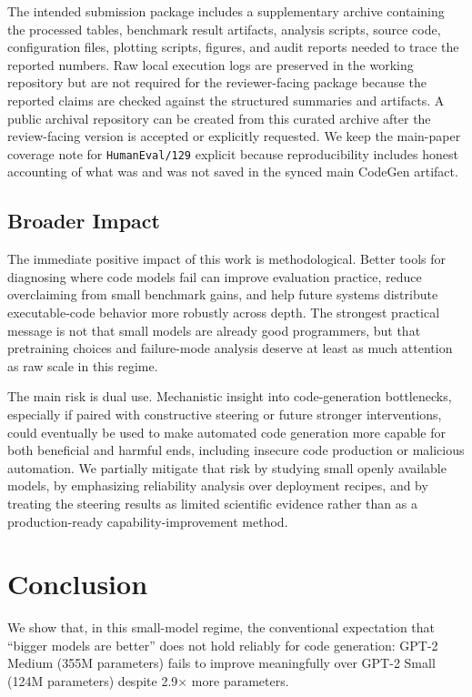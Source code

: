 \documentclass[preprint,12pt,authoryear]{elsarticle}
\begin{document}
The intended submission package includes a supplementary archive containing the processed tables, benchmark result artifacts, analysis scripts, source code, configuration files, plotting scripts, figures, and audit reports needed to trace the reported numbers. Raw local execution logs are preserved in the working repository but are not required for the reviewer-facing package because the reported claims are checked against the structured summaries and artifacts. A public archival repository can be created from this curated archive after the review-facing version is accepted or explicitly requested. We keep the main-paper coverage note for \texttt{HumanEval/129} explicit because reproducibility includes honest accounting of what was and was not saved in the synced main CodeGen artifact.

\subsection{Broader Impact}

The immediate positive impact of this work is methodological. Better tools for diagnosing where code models fail can improve evaluation practice, reduce overclaiming from small benchmark gains, and help future systems distribute executable-code behavior more robustly across depth. The strongest practical message is not that small models are already good programmers, but that pretraining choices and failure-mode analysis deserve at least as much attention as raw scale in this regime.

The main risk is dual use. Mechanistic insight into code-generation bottlenecks, especially if paired with constructive steering or future stronger interventions, could eventually be used to make automated code generation more capable for both beneficial and harmful ends, including insecure code production or malicious automation. We partially mitigate that risk by studying small openly available models, by emphasizing reliability analysis over deployment recipes, and by treating the steering results as limited scientific evidence rather than as a production-ready capability-improvement method.

\section{Conclusion}

We show that, in this small-model regime, the conventional expectation that ``bigger models are better'' does not hold reliably for code generation: GPT-2 Medium (355M parameters) fails to improve meaningfully over GPT-2 Small (124M parameters) despite 2.9$\times$ more parameters.
\end{document}
